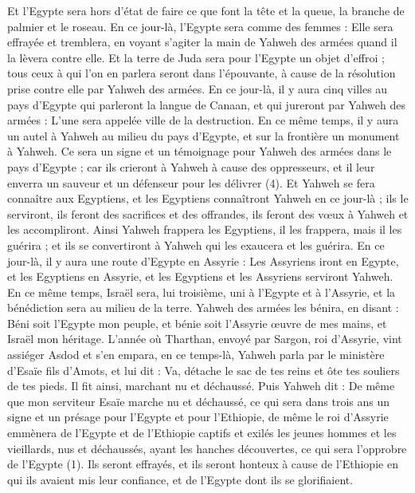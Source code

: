 \begin{multicols}{2}
{Et l'Egypte sera hors d’état de faire ce que font la tête et la queue, la branche de palmier et le roseau.
En ce jour-là, l'Egypte sera comme des femmes : Elle sera effrayée et tremblera, en voyant s’agiter la main de Yahweh des armées quand il la lèvera contre elle.
Et la terre de Juda sera pour l'Egypte un objet d’effroi ; tous ceux à qui l’on en parlera seront dans l’épouvante, à cause de la résolution prise contre elle par Yahweh des armées.
En ce jour-là, il y aura cinq villes au pays d'Egypte qui parleront la langue de Canaan, et qui jureront par Yahweh des armées : L'une sera appelée ville de la destruction.
En ce même temps, il y aura un autel à Yahweh au milieu du pays d'Egypte, et sur la frontière un monument à Yahweh.
Ce sera un signe et un témoignage pour Yahweh des armées dans le pays d'Egypte ; car ils crieront à Yahweh à cause des oppresseurs, et il leur enverra un sauveur et un défenseur pour les délivrer (4).
Et Yahweh se fera connaître aux Egyptiens, et les Egyptiens connaîtront Yahweh en ce jour-là ; ils le serviront, ils feront des sacrifices et des offrandes, ils feront des vœux à Yahweh et les accompliront.
Ainsi Yahweh frappera les Egyptiens, il les frappera, mais il les guérira ; et ils se convertiront à Yahweh qui les exaucera et les guérira.
En ce jour-là, il y aura une route d’Egypte en Assyrie : Les Assyriens iront en Egypte, et les Egyptiens en Assyrie, et les Egyptiens et les Assyriens serviront Yahweh.
En ce même temps, Israël sera, lui troisième, uni à l'Egypte et à l'Assyrie, et la bénédiction sera au milieu de la terre.
Yahweh des armées les bénira, en disant : Béni soit l'Egypte mon peuple, et bénie soit l'Assyrie œuvre de mes mains, et Israël mon héritage.
\VerseOne{}L'année où Tharthan, envoyé par Sargon, roi d'Assyrie, vint assiéger Asdod et s’en empara,
en ce temps-là, Yahweh parla par le ministère d'Esaïe fils d'Amots, et lui dit : Va, détache le sac de tes reins et ôte tes souliers de tes pieds. Il fit ainsi, marchant nu et déchaussé.
Puis Yahweh dit : De même que mon serviteur Esaïe marche nu et déchaussé, ce qui sera dans trois ans un signe et un présage pour l'Egypte et pour l’Ethiopie,
de même le roi d'Assyrie emmènera de l’Egypte et de l’Ethiopie captifs et exilés les jeunes hommes et les vieillards, nus et déchaussés, ayant les hanches découvertes, ce qui sera l'opprobre de l'Egypte (1).
Ils seront effrayés, et ils seront honteux à cause de l’Ethiopie en qui ils avaient mis leur confiance, et de l'Egypte dont ils se glorifiaient.
}
\end{multicols}
